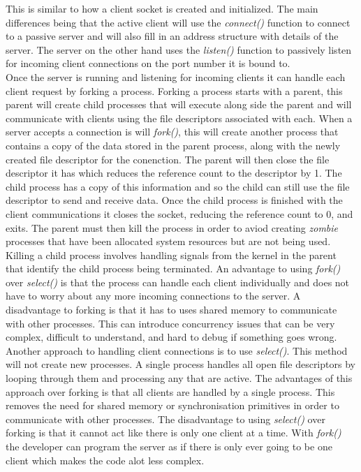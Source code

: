 \documentclass[12pt,a4paper,titlepage]{article}
\begin{document}
This is similar to how a client socket is created and initialized. The main differences being that the active client will use the \textit{connect()} function to connect to a passive server and will also fill in an address structure with details of the server. The server on the other hand uses the \textit{listen()} function to passively listen for incoming client connections on the port number it is bound to. \\

Once the server is running and listening for incoming clients it can handle each client request by forking a process. Forking a process starts with a parent, this parent will create child processes that will execute along side the parent and will communicate with clients using the file descriptors associated with each. When a server accepts a connection is will \textit{fork()}, this will create another process that contains a copy of the data stored in the parent process, along with the newly created file descriptor for the conenction. The parent will then close the file descriptor it has which reduces the reference count to the descriptor by 1. The child process has a copy of this information and so the child can still use the file descriptor to send and receive data. Once the child process is finished with the client communications it closes the socket, reducing the reference count to 0, and exits. The parent must then kill the process in order to aviod creating \textit{zombie} processes that have been allocated system resources but are not being used. Killing a child process involves handling signals from the kernel in the parent that identify the child process being terminated. An advantage to using \textit{fork()} over \textit{select()} is that the process can handle each client individually and does not have to worry about any more incoming connections to the server. A disadvantage to forking is that it has to uses shared memory to communicate with other processes. This can introduce concurrency issues that can be very complex, difficult to understand, and hard to debug if something goes wrong.\\

Another approach to handling client connections is to use \textit{select()}. This method will not create new processes. A single process handles all open file descriptors by looping through them and processing any that are active. The advantages of this approach over forking is that all clients are handled by a single process. This removes the need for shared memory or synchronisation primitives in order to communicate with other processes.\cite{theworldofselect} The disadvantage to using \textit{select()} over forking is that it cannot act like there is only one client at a time. With \textit{fork()} the developer can program the server as if there is only ever going to be one client which makes the code alot less complex. 
\end{document}
